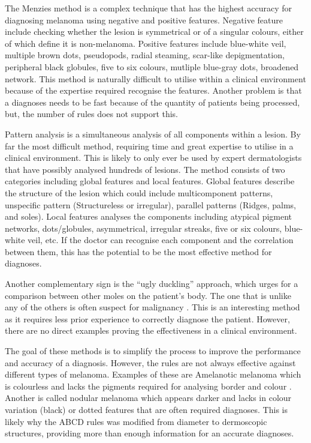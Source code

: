 The Menzies method is a complex technique that has the highest accuracy\cite{Carrera2016} for diagnosing melanoma using negative and positive features. Negative feature include checking whether the lesion is symmetrical or of a singular colours, either of which define it is non-melanoma. Positive features include blue-white veil, multiple brown dots, pseudopods, radial steaming, scar-like depigmentation, peripheral black globules, five to six colours, mutliple blue-gray dots, broadened network. This method is naturally difficult to utilise within a clinical environment because of the expertise required recognise the features. Another problem is that a diagnoses needs to be fast because of the quantity of patients being processed, but, the number of rules does not support this.

Pattern analysis is a simultaneous analysis of all components within a lesion. By far the most difficult method, requiring time and great expertise to utilise in a clinical environment. This is likely to only ever be used by expert dermatologists that have possibly analysed hundreds of lesions. The method consists of two categories including global features and local features. Global features describe the structure of the lesion which could include multicomponent patterns, unspecific pattern (Structureless or irregular), parallel patterns (Ridges, palms, and soles). Local features analyses the components including atypical pigment networks, dots/globules, asymmetrical, irregular streaks, five or six colours, blue-white veil, etc. If the doctor can recognise each component and the correlation between them, this has the potential to be the most effective method for diagnoses.

Another complementary sign is the “ugly duckling” approach, which urges for a comparison between other moles on the patient’s body. The one that is unlike any of the others is often suspect for malignancy \cite{Jensen2015}. This is an interesting method as it requires less prior experience to correctly diagnose the patient. However, there are no direct examples proving the effectiveness in a clinical environment.

The goal of these methods is to simplify the process to improve the performance and accuracy of a diagnosis. However, the rules are not always effective against different types of melanoma. Examples of these are Amelanotic melanoma which is colourless and lacks the pigments required for analysing border and colour \cite{Pizzichetta2004}. Another is called nodular melanoma which appears darker and lacks in colour variation (black) or dotted features that are often required diagnoses. This is likely why the ABCD rules was modified from diameter to dermoscopic structures, providing more than enough information for an accurate diagnoses.


